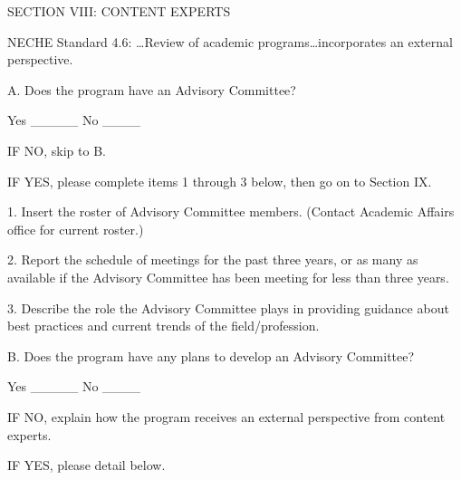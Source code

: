 SECTION VIII: CONTENT EXPERTS

NECHE Standard 4.6: …Review of academic programs…incorporates an external perspective.

A. Does the program have an Advisory Committee?

Yes _____		 No ____

IF NO, skip to B.

IF YES, please complete items 1 through 3 below, then go on to Section IX.

1. Insert the roster of Advisory Committee members. (Contact Academic Affairs office for current roster.)



2. Report the schedule of meetings for the past three years, or as many as available if the Advisory Committee has been meeting for less than three years.




3. Describe the role the Advisory Committee plays in providing guidance about best practices and current trends of the field/profession.





B. Does the program have any plans to develop an Advisory Committee?

Yes _____ 		No ____

IF NO, explain how the program receives an external perspective from content experts.

	IF YES, please detail below.
